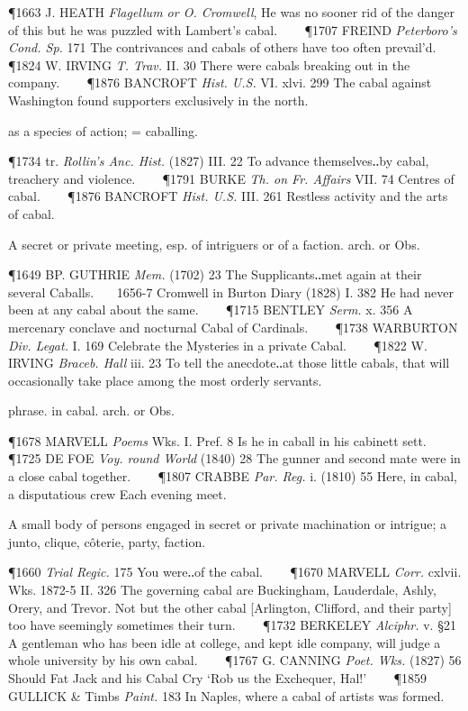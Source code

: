 \begin{description}[wide, labelwidth=!, labelindent=0pt]
\begin{myenumerate}
\P 1663 J. HEATH  \textit{Flagellum or O. Cromwell}, He was no sooner rid of the danger of this but he was puzzled with Lambert's cabal.    
\P 1707 FREIND  \textit{Peterboro's Cond. Sp.} 171 The contrivances and cabals of others have too often prevail'd.    
\P 1824 W. IRVING  \textit{T. Trav.} II. 30 There were cabals breaking out in the company.    
\P 1876 BANCROFT  \textit{Hist. U.S.} VI. xlvi. 299 The cabal against Washington found supporters exclusively in the north.

 as a species of action; = caballing.

\P 1734 tr. \textit{Rollin's Anc. Hist.} (1827) III. 22 To advance themselves‥by cabal, treachery and violence.    
\P 1791 BURKE  \textit{Th. on Fr. Affairs} VII. 74 Centres of cabal.    
\P 1876 BANCROFT  \textit{Hist. U.S.} III. 261 Restless activity and the arts of cabal.

 A secret or private meeting, esp. of intriguers or of a faction. arch. or Obs.

\P 1649 BP. GUTHRIE  \textit{Mem.} (1702) 23 The Supplicants‥met again at their several Caballs.    1656-7 Cromwell in Burton Diary (1828) I. 382 He had never been at any cabal about the same.    
\P 1715 BENTLEY  \textit{Serm.} x. 356 A mercenary conclave and nocturnal Cabal of Cardinals.    
\P 1738 WARBURTON  \textit{Div. Legat.} I. 169 Celebrate the Mysteries in a private Cabal.    
\P 1822 W. IRVING  \textit{Braceb. Hall} iii. 23 To tell the anecdote‥at those little cabals, that will occasionally take place among the most orderly servants.

 phrase. in cabal. arch. or Obs.

\P 1678 MARVELL  \textit{Poems} Wks. I. Pref. 8 Is he in caball in his cabinett sett.    
\P 1725 DE FOE  \textit{Voy. round World} (1840) 28 The gunner and second mate were in a close cabal together.    
\P 1807 CRABBE  \textit{Par. Reg.} i. (1810) 55 Here, in cabal, a disputatious crew Each evening meet.

 A small body of persons engaged in secret or private machination or intrigue; a junto, clique, côterie, party, faction.

\P 1660 \textit{Trial  Regic.} 175 You were‥of the cabal.    
\P 1670 MARVELL  \textit{Corr.} cxlvii. Wks. 1872-5 II. 326 The governing cabal are Buckingham, Lauderdale, Ashly, Orery, and Trevor. Not but the other cabal [Arlington, Clifford, and their party] too have seemingly sometimes their turn.    
\P 1732 BERKELEY  \textit{Alciphr.} v. §21 A gentleman who has been idle at college, and kept idle company, will judge a whole university by his own cabal.    
\P 1767 G. CANNING  \textit{Poet. Wks.} (1827) 56 Should Fat Jack and his Cabal Cry ‘Rob us the Exchequer, Hal!’    
\P 1859 GULLICK  \& Timbs \textit{Paint.} 183 In Naples, where a cabal of artists was formed.


\end{myenumerate}
\end{description}

